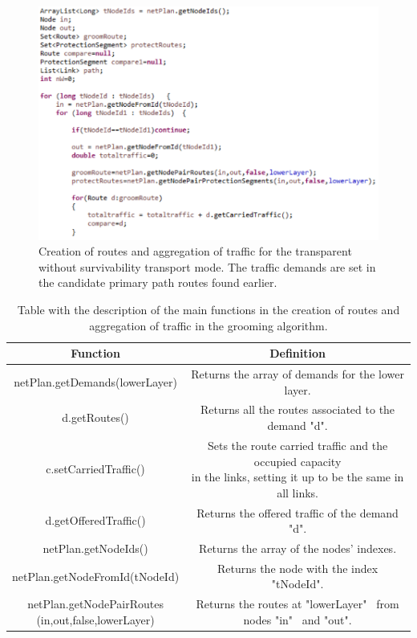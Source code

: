 \begin{figure}[H]
\centering
\includegraphics[width=14cm]{sdf/heuristic/transparent_survivability/figures/grooming_transparent_surv2}
\caption{Creation of routes and aggregation of traffic for the transparent without survivability transport mode. The traffic demands are set in the candidate primary path routes found earlier.}
\label{grooming_transparent_surv2}
\end{figure}

\begin{table}[H]
\centering
\begin{tabular}{|| c | c ||}
 \hline
 Function & Definition \\
 \hline\hline
 netPlan.getDemands(lowerLayer) & Returns the array of demands for the lower layer. \\
 \hline
 d.getRoutes() & Returns all the routes associated to the demand "d". \\
 \hline
 c.setCarriedTraffic() & \makecell{Sets the route carried traffic and the occupied capacity\\in the links, setting it up to be the same in all links.} \\
 \hline
 d.getOfferedTraffic() & Returns the offered traffic of the demand "d". \\
 \hline
 netPlan.getNodeIds() & Returns the array of the nodes' indexes. \\
 \hline
 netPlan.getNodeFromId(tNodeId) & Returns the node with the index "tNodeId". \\
 \hline
 \makecell{netPlan.getNodePairRoutes\\(in,out,false,lowerLayer)} & Returns the routes at "lowerLayer" \ from nodes "in" \ and "out". \\
 \hline
\end{tabular}
\caption{Table with the description of the main functions in the creation of routes and aggregation of traffic in the grooming algorithm.}
\label{grooming_table_variables_transparent}
\end{table}

